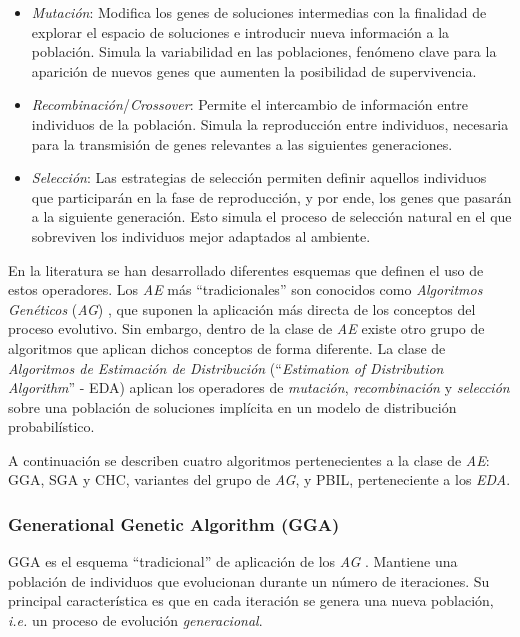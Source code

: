 \begin{itemize}
\item \emph{Mutación}: Modifica los genes de soluciones intermedias con la finalidad de explorar el espacio de soluciones e introducir nueva información a la población. Simula la variabilidad en las poblaciones, fenómeno clave para la aparición de nuevos genes que aumenten la posibilidad de supervivencia.
\item \emph{Recombinación}/\emph{Crossover}: Permite el intercambio de información entre individuos de la población. Simula la reproducción entre individuos, necesaria para la transmisión de genes relevantes a las siguientes generaciones.
\item \emph{Selección}: Las estrategias de selección permiten definir aquellos individuos que participarán en la fase de reproducción, y por ende, los genes que pasarán a la siguiente generación. Esto simula el proceso de selección natural en el que sobreviven los individuos mejor adaptados al ambiente.
\end{itemize}

En la literatura se han desarrollado diferentes esquemas que definen el uso de estos operadores. Los \emph{AE} más ``tradicionales'' son conocidos como \emph{Algoritmos Genéticos} (\emph{AG}) \cite{holland1975adaptation}, que suponen la aplicación más directa de los conceptos del proceso evolutivo. Sin embargo, dentro de la clase de \emph{AE} existe otro grupo de algoritmos que aplican dichos conceptos de forma diferente. La clase de \emph{Algoritmos de Estimación de Distribución} (``\emph{Estimation of Distribution Algorithm}'' - EDA) aplican los operadores de \emph{mutación}, \emph{recombinación} y \emph{selección} sobre una población de soluciones implícita en un modelo de distribución probabilístico.

A continuación se describen cuatro algoritmos pertenecientes a la clase de \emph{AE}: GGA, SGA y CHC, variantes del grupo de \emph{AG}, y PBIL, perteneciente a los \emph{EDA}.

\subsubsection{Generational Genetic Algorithm (GGA)}

GGA es el esquema ``tradicional'' de aplicación de los \emph{AG} \cite{back1996evolutionary,Muhlenbein91evolutionin}. Mantiene una población de individuos que evolucionan durante un número de iteraciones. Su principal característica es que en cada iteración se genera una nueva población, \emph{i.e.} un proceso de evolución \emph{generacional}.

